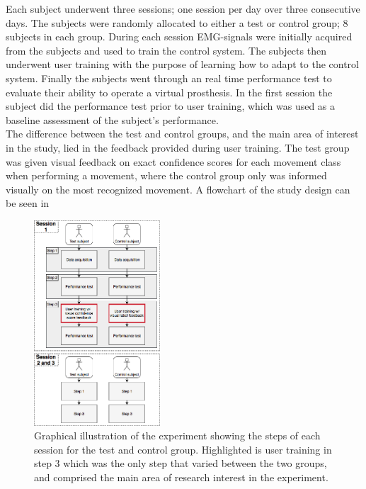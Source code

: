Each subject underwent three sessions; one session per day over three consecutive days. The subjects were randomly allocated to either a test or control group; 8 subjects in each group. During each session EMG-signals were initially acquired from the subjects and used to train the control system. The subjects then underwent user training with the purpose of learning how to adapt to the control system. Finally the subjects went through an real time performance test to evaluate their ability to operate a virtual prosthesis. In the first session the subject did the performance test prior to user training, which was used as a baseline assessment of the subject's performance. \\
The difference between the test and control groups, and the main area of interest in the study, lied in the feedback provided during user training. The test group was given visual feedback on exact confidence scores for each movement class when performing a movement, where the control group only was informed visually on the most recognized movement. A flowchart of the study design can be seen in 


\begin{figure}[H]                                         
	\includegraphics[width=0.42\textwidth]{figures/Paper/Study_design}  
	\caption{Graphical illustration of the experiment showing the steps of each session for the test and control group. Highlighted is user training in step 3 which was the only step that varied between the two groups, and comprised the main area of research interest in the experiment.}
	\label{fig:P:std} 
\end{figure}